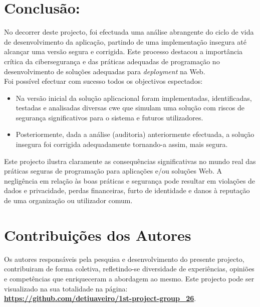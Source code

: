 \chapter*{Conclusão:}
\label{chap.conclusão}
No decorrer deste projecto, foi efectuada uma análise abrangente do ciclo de vida de desenvolvimento da aplicação, partindo de uma implementação insegura até alcançar uma versão segura e corrigida. Este processo destacou a importância crítica da cibersegurança e das práticas adequadas de programação no desenvolvimento de soluções adequadas para \textit{deployment} na Web. \\

Foi possível efectuar com sucesso todos os objectivos espectados:
    \begin{itemize}
        \item Na versão inicial da solução aplicacional foram implementadas, identificadas, testadas e analisadas diversas \acf{cwe} que simulam uma solução com riscos de segurança significativos para o sistema e futuros utilizadores.
        \item  Posteriormente, dada a análise (auditoria) anteriormente efectuada, a solução insegura foi corrigida adequadamente tornando-a assim, mais segura.
    \end{itemize}

Este projecto ilustra claramente as consequências significativas no mundo real das práticas seguras de programação para aplicações e/ou soluções Web. A negligência em relação às boas práticas e segurança  pode resultar em violações de dados e privacidade, perdas financeiras, furto de identidade e danos à reputação de uma organização ou utilizador comum.
%
% 
\chapter*{Contribuições dos Autores}

        Os autores responsáveis pela pesquisa e desenvolvimento do presente projecto, contribuiram de forma coletiva, refletindo-se diversidade de experiências, opiniões e competências que enriqueceram a abordagem ao mesmo. Este projecto pode ser visualizado na sua totalidade na página: \textbf{\url{https://github.com/detiuaveiro/1st-project-group_26}}. \\

